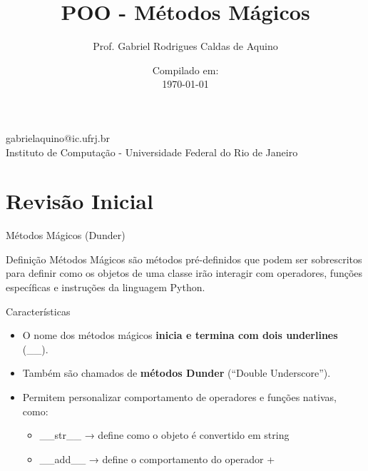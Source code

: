 \title{POO - Métodos Mágicos}

\author{Prof. Gabriel Rodrigues Caldas de Aquino}

\institute
{
    gabrielaquino@ic.ufrj.br\\
    
    Instituto de Computação -
    Universidade Federal do Rio de Janeiro %
}
\date{Compilado em: \\ \today} %


\section{Revisão Inicial}

\begin{frame}
    \titlepage
\end{frame}

\begin{frame}{Métodos Mágicos (Dunder)}

\begin{block}{Definição}
Métodos Mágicos são métodos pré-definidos que podem ser sobrescritos para definir como os objetos de uma classe irão interagir com operadores, funções específicas e instruções da linguagem Python.
\end{block}

\begin{block}{Características}
\begin{itemize}
    \item O nome dos métodos mágicos \textbf{inicia e termina com dois underlines} (\_\_).
    \item Também são chamados de \textbf{métodos Dunder} (“Double Underscore”).
    \item Permitem personalizar comportamento de operadores e funções nativas, como:
    \begin{itemize}
        \item \_\_str\_\_ → define como o objeto é convertido em string
        \item \_\_add\_\_ → define o comportamento do operador +
    \end{itemize}
\end{itemize}
\end{block}

\end{frame}

